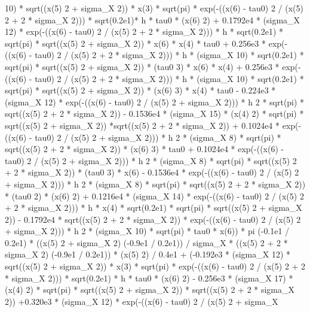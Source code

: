 \begin{maplegroup}
 10) * sqrt((x(5)  2 + sigma\_X  2)) * x(3) * sqrt(pi) * exp(-((x(6) - tau0)  2 / (x(5)  2 + 2 * sigma\_X  2))) * sqrt(0.2e1)* h * tau0 * (x(6)  2) + 0.1792e4 * (sigma\_X  12) * exp(-((x(6) - tau0)  2 / (x(5)  2 + 2 * sigma\_X  2))) * h * sqrt(0.2e1) * sqrt(pi) * sqrt((x(5)  2 + sigma\_X  2)) * x(6) * x(4) * tau0 + 0.256e3 * exp(-((x(6) - tau0)  2 / (x(5)  2 + 2 * sigma\_X 2))) * h * (sigma\_X  10) * sqrt(0.2e1) * sqrt(pi) * sqrt((x(5)  2 + sigma\_X  2)) * (tau0  3) * x(6) * x(4) + 0.256e3 * exp(-((x(6) - tau0)  2 / (x(5)  2 + 2 * sigma\_X  2))) * h * (sigma\_X  10) * sqrt(0.2e1) * sqrt(pi) * sqrt((x(5)  2 + sigma\_X 2)) * (x(6)  3) * x(4) * tau0 - 0.224e3 * (sigma\_X  12) * exp(-((x(6) - tau0)  2 / (x(5)  2 + sigma\_X  2))) * h  2 * sqrt(pi) * sqrt((x(5)  2 + 2 * sigma\_X  2)) - 0.1536e4 * (sigma\_X  15) * (x(4)  2) * sqrt(pi) * sqrt((x(5)  2 + sigma\_X  2)) *sqrt((x(5)  2 + 2 * sigma\_X  2)) + 0.1024e4 * exp(-((x(6) - tau0)  2 / (x(5)  2 + sigma\_X  2))) * h  2 * (sigma\_X  8) * sqrt(pi) * sqrt((x(5)  2 + 2 * sigma\_X  2)) * (x(6)  3) * tau0 + 0.1024e4 * exp(-((x(6) - tau0)  2 / (x(5)  2 + sigma\_X  2))) * h  2 * (sigma\_X  8) * sqrt(pi) * sqrt((x(5)  2 + 2 * sigma\_X  2)) * (tau0  3) * x(6) - 0.1536e4 * exp(-((x(6) - tau0)  2 / (x(5)  2 + sigma\_X  2))) * h  2 * (sigma\_X  8) * sqrt(pi) * sqrt((x(5)  2 + 2 * sigma\_X  2)) * (tau0  2) * (x(6) 2) + 0.1216e4 * (sigma\_X  14) * exp(-((x(6) - tau0)  2 / (x(5)  2 + 2 * sigma\_X  2))) * h * x(4) * sqrt(0.2e1) * sqrt(pi) * sqrt((x(5)  2 + sigma\_X  2)) - 0.1792e4 * sqrt((x(5)  2 + 2 * sigma\_X  2)) * exp(-((x(6) - tau0)  2 / (x(5)  2 + sigma\_X 2))) * h  2 * (sigma\_X  10) * sqrt(pi) * tau0 * x(6)) * pi  (-0.1e1 / 0.2e1) * ((x(5)  2 + sigma\_X  2)  (-0.9e1 / 0.2e1)) / sigma\_X * ((x(5)  2 + 2 * sigma\_X  2)  (-0.9e1 / 0.2e1)) * (x(5)  2) / 0.4e1 + (-0.192e3 * (sigma\_X  12) * sqrt((x(5) 2 + sigma\_X  2)) * x(3) * sqrt(pi) * exp(-((x(6) - tau0)  2 / (x(5)  2 + 2 * sigma\_X  2))) * sqrt(0.2e1) * h * tau0 * (x(6)  2) - 0.256e3 * (sigma\_X  17) * (x(4)  2) * sqrt(pi) * sqrt((x(5)  2 + sigma\_X  2)) * sqrt((x(5)  2 + 2 * sigma\_X  2)) +0.320e3 * (sigma\_X  12) * exp(-((x(6) - tau0)  2 / (x(5)  2 + sigma\_X 
\end{maplegroup}
